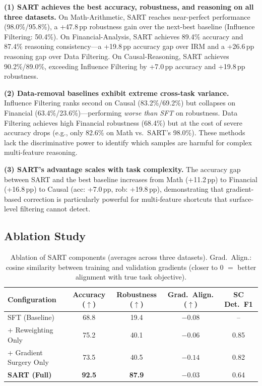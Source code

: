 \textbf{(1) SART achieves the best accuracy, robustness, and reasoning on all three datasets.} On Math-Arithmetic, SART reaches near-perfect performance (98.0\%/95.8\%), a +47.8\,pp robustness gain over the next-best baseline (Influence Filtering: 50.4\%). On Financial-Analysis, SART achieves 89.4\% accuracy and 87.4\% reasoning consistency---a +19.8\,pp accuracy gap over IRM and a +26.6\,pp reasoning gap over Data Filtering. On Causal-Reasoning, SART achieves 90.2\%/89.0\%, exceeding Influence Filtering by +7.0\,pp accuracy and +19.8\,pp robustness.

\textbf{(2) Data-removal baselines exhibit extreme cross-task variance.} Influence Filtering ranks second on Causal (83.2\%/69.2\%) but collapses on Financial (63.4\%/23.6\%)---performing \emph{worse than SFT} on robustness. Data Filtering achieves high Financial robustness (68.4\%) but at the cost of severe accuracy drops (e.g., only 82.6\% on Math vs.\ SART's 98.0\%). These methods lack the discriminative power to identify which samples are harmful for complex multi-feature reasoning.

\textbf{(3) SART's advantage scales with task complexity.} The accuracy gap between SART and the best baseline increases from Math (+11.2\,pp) to Financial (+16.8\,pp) to Causal (acc: +7.0\,pp, rob: +19.8\,pp), demonstrating that gradient-based correction is particularly powerful for multi-feature shortcuts that surface-level filtering cannot detect.

\subsection{Ablation Study}
\label{sec:exp_ablation}

\begin{table}[t]
\centering
\caption{Ablation of SART components (averages across three datasets). Grad.\ Align.: cosine similarity between training and validation gradients (closer to 0 $=$ better alignment with true task objective).}
\label{tab:ablation}
\small
\begin{tabular}{lcccc}
\toprule
\textbf{Configuration} & \textbf{Accuracy} ($\uparrow$) & \textbf{Robustness} ($\uparrow$) & \textbf{Grad.\ Align.} ($\uparrow$) & \textbf{SC Det.\ F1} \\
\midrule
SFT (Baseline)              & 68.8 & 19.4  & $-0.08$ & -- \\
\midrule
+ Reweighting Only          & 75.2 & 40.1  & $-0.06$ & 0.85 \\
+ Gradient Surgery Only     & 73.5 & 40.5  & $-0.14$ & 0.82 \\
\midrule
\textbf{SART (Full)}        & \textbf{92.5} & \textbf{87.9}  & $\mathbf{-0.03}$ & 0.64 \\
\bottomrule
\end{tabular}
\end{table}

